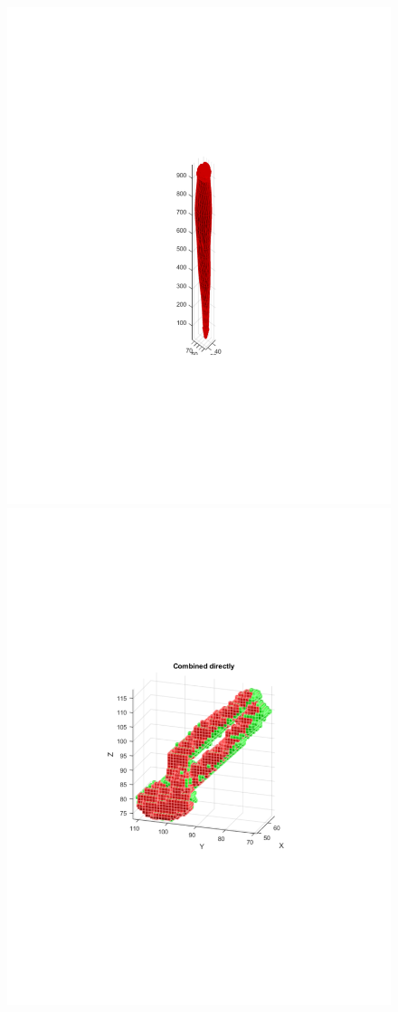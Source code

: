 \documentclass{UCF_ETD}
\begin{document}
\begin{figure}[H]
\begin{center}
\includegraphics[scale=0.34]{RobustRegistration/NoiselessAnomalies8}
\hspace{1cm}
\includegraphics[scale=0.35]{RobustRegistration/NoiselessAnomaliesResult1}

\end{center}
\end{figure}
\end{document}
